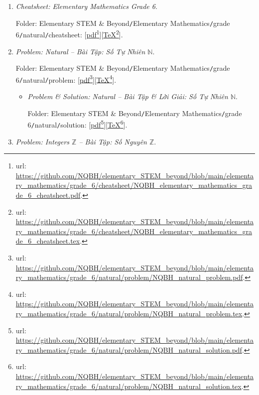 \documentclass[12pt]{article}
\begin{document}
\begin{enumerate}
	\item {\it Cheatsheet: Elementary Mathematics Grade 6}.
	
	Folder: {\sf Elementary STEM \& Beyond{\tt/}Elementary Mathematics{\tt/}grade 6{\tt/}natural{\tt/}cheatsheet}: [\href{https://github.com/NQBH/elementary_STEM_beyond/blob/main/elementary_mathematics/grade_6/cheatsheet/NQBH_elementary_mathematics_grade_6_cheatsheet.pdf}{pdf}\footnote{{\sc url}: \url{https://github.com/NQBH/elementary_STEM_beyond/blob/main/elementary_mathematics/grade_6/cheatsheet/NQBH_elementary_mathematics_grade_6_cheatsheet.pdf}.}][\href{https://github.com/NQBH/elementary_STEM_beyond/blob/main/elementary_mathematics/grade_6/cheatsheet/NQBH_elementary_mathematics_grade_6_cheatsheet.tex}{\TeX}\footnote{{\sc url}: \url{https://github.com/NQBH/elementary_STEM_beyond/blob/main/elementary_mathematics/grade_6/cheatsheet/NQBH_elementary_mathematics_grade_6_cheatsheet.tex}.}].
	\item {\it Problem: Natural -- Bài Tập: Số Tự Nhiên $\mathbb{N}$}.
	
	Folder: {\sf Elementary STEM \& Beyond{\tt/}Elementary Mathematics{\tt/}grade 6{\tt/}natural{\tt/}problem}: [\href{https://github.com/NQBH/elementary_STEM_beyond/blob/main/elementary_mathematics/grade_6/natural/problem/NQBH_natural_problem.pdf}{pdf}\footnote{{\sc url}: \url{https://github.com/NQBH/elementary_STEM_beyond/blob/main/elementary_mathematics/grade_6/natural/problem/NQBH_natural_problem.pdf}.}][\href{https://github.com/NQBH/elementary_STEM_beyond/blob/main/elementary_mathematics/grade_6/natural/problem/NQBH_natural_problem.tex}{\TeX}\footnote{{\sc url}: \url{https://github.com/NQBH/elementary_STEM_beyond/blob/main/elementary_mathematics/grade_6/natural/problem/NQBH_natural_problem.tex}.}].
	\begin{itemize}
		\item {\it Problem \& Solution: Natural -- Bài Tập \& Lời Giải: Số Tự Nhiên $\mathbb{N}$}.
		
		Folder: {\sf Elementary STEM \& Beyond{\tt/}Elementary Mathematics{\tt/}grade 6{\tt/}natural{\tt/}solution}: [\href{https://github.com/NQBH/elementary_STEM_beyond/blob/main/elementary_mathematics/grade_6/natural/problem/NQBH_natural_solution}{pdf}\footnote{{\sc url}: \url{https://github.com/NQBH/elementary_STEM_beyond/blob/main/elementary_mathematics/grade_6/natural/problem/NQBH_natural_solution.pdf}.}][\href{https://github.com/NQBH/elementary_STEM_beyond/blob/main/elementary_mathematics/grade_6/natural/problem/NQBH_natural_solution.tex}{\TeX}\footnote{{\sc url}: \url{https://github.com/NQBH/elementary_STEM_beyond/blob/main/elementary_mathematics/grade_6/natural/problem/NQBH_natural_solution.tex}.}].
	\end{itemize}
	\item {\it Problem: Integers $\mathbb{Z}$ -- Bài Tập: Số Nguyên $\mathbb{Z}$}.
	

\end{enumerate}
\end{document}
